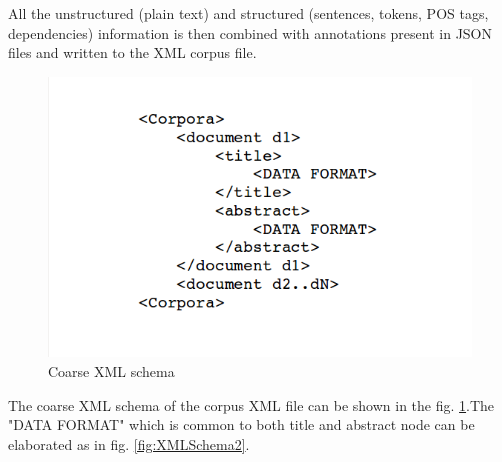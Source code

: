 \begin{enumerate}
All the unstructured (plain text) and structured (sentences, tokens, POS tags, dependencies) information is then combined with annotations present in JSON files and written to the XML corpus file.

\begin{figure}
\centering
\includegraphics[scale=0.4]{figures/XMLSchema1.png}
\caption{Coarse XML schema}\label{fig:XMLSchema1}
\end{figure}

The coarse XML schema of the corpus XML file can be shown in the fig. \ref{fig:XMLSchema1}.The "DATA FORMAT" which is common to both title and abstract node can be elaborated as in fig. \ref{fig:XMLSchema2}.


\end{enumerate}
